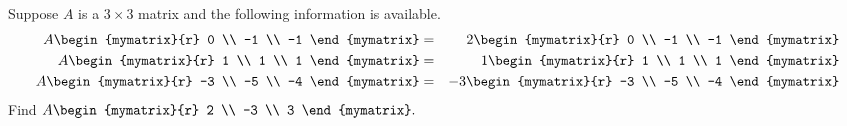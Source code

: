 \begin{enumialphparenastyle}
\begin{ex} Suppose $A$ is a $3\times 3$ matrix and the following information is
available.
\begin{eqnarray*}
A\begin{mymatrix}{r}
0 \\
-1 \\
-1
\end{mymatrix} &=&2\begin{mymatrix}{r}
0 \\
-1 \\
-1
\end{mymatrix} \\
A\begin{mymatrix}{r}
1 \\
1 \\
1
\end{mymatrix} &=& 1\begin{mymatrix}{r}
1 \\
1 \\
1
\end{mymatrix} \\
A\begin{mymatrix}{r}
-3 \\
-5 \\
-4
\end{mymatrix} &=&-3\begin{mymatrix}{r}
-3 \\
-5 \\
-4
\end{mymatrix}
\end{eqnarray*}
Find $A\begin{mymatrix}{r}
2 \\
-3 \\
3
\end{mymatrix}. $ \vspace{1mm}
\end{ex}

\end{enumialphparenastyle}